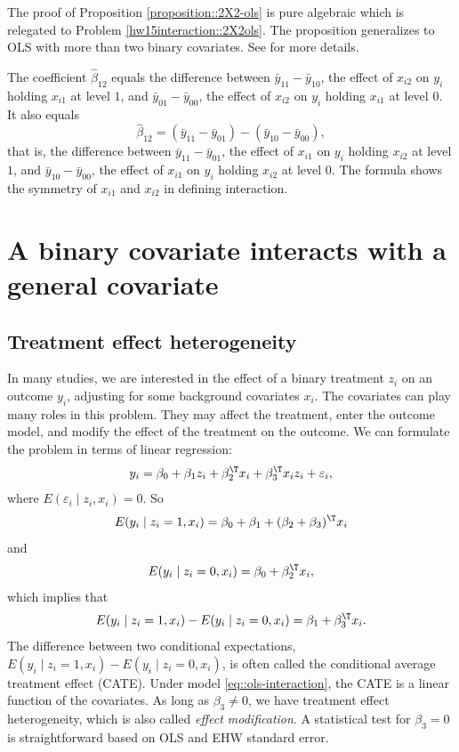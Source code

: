 The proof of Proposition \ref{proposition::2X2-ols} is pure algebraic which is relegated to Problem \ref{hw15interaction::2X2ols}. 
The proposition generalizes to OLS with more than two binary covariates. See \citet{zhao2021regression} for more details. 


The coefficient $\hat{\beta}_{12}$ equals the difference between $\bar{y}_{11}-\bar{y}_{10}$, the effect of $x_{i2}$ on $y_i$ holding $x_{i1}$ at level $1$, and $\bar{y}_{01}-\bar{y}_{00}$, the effect of $x_{i2}$ on $y_i$ holding $x_{i1}$ at level $0$. It also equals 
$$
\hat{\beta}_{12}  =  (\bar{y}_{11}-\bar{y}_{01})-(\bar{y}_{10}-\bar{y}_{00}),
$$
that is, the difference between $\bar{y}_{11}-\bar{y}_{01} $, the effect of $x_{i1}$ on $y_i$ holding $x_{i2}$ at level $1$, and $\bar{y}_{10}-\bar{y}_{00}$, the effect of $x_{i1}$ on $y_i$ holding $x_{i2}$ at level $0$. The formula shows the symmetry of $x_{i1} $ and $x_{i2}$ in defining interaction. 




\section{A binary covariate interacts with a general covariate}


\subsection{Treatment effect heterogeneity}


In many studies, we are interested in the effect of a binary treatment $z_i$ on an outcome $y_i$, adjusting for some background covariates $x_i$. The covariates can play many roles in this problem. They may affect the treatment, enter the outcome model, and modify the effect of the treatment on the outcome. We can formulate the problem in terms of linear regression: 
\begin{eqnarray}
\label{eq::ols-interaction}
y_i =  \beta_0 + \beta_1 z_i + \beta_2^{\T} x_i + \beta_3^{\T} x_iz_i  + \varepsilon_i ,
\end{eqnarray}
where $E( \varepsilon_i \mid z_i, x_i ) = 0$. So
$$
E(y_i \mid z_i = 1, x_i) =  \beta_0 + \beta_1 + (\beta_2 + \beta_3)^{\T} x_i
$$
and
$$
E(y_i \mid z_i = 0, x_i) =  \beta_0   + \beta_2  ^{\T} x_i,
$$
which implies that
$$
E(y_i \mid z_i = 1, x_i)  - E(y_i \mid z_i = 0, x_i)  = \beta_1 + \beta_3^{\T} x_i.
$$
The difference between two conditional expectations, $E(y_i \mid z_i = 1, x_i)  - E(y_i \mid z_i = 0, x_i) $, is often called the conditional average treatment effect (CATE). Under model \eqref{eq::ols-interaction}, the CATE is a linear function of the covariates. As long as $\beta_3 \neq 0$, we have treatment effect heterogeneity, which is also called {\it effect modification}. A statistical test for $\beta_3 = 0$ is straightforward based on OLS and EHW standard error. 

